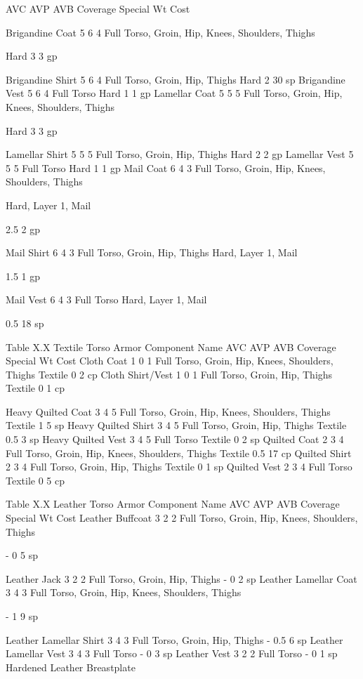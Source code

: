\documentclass[oneside,11pt,english]{book}
\begin{document}
AVC AVP AVB Coverage Special Wt Cost 

Brigandine Coat 5 6 4 Full Torso, Groin, Hip, Knees, Shoulders, 
Thighs 

Hard 3 3 gp 

Brigandine Shirt 5 6 4 Full Torso, Groin, Hip, Thighs Hard 2 30 
sp 
Brigandine Vest 5 6 4 Full Torso Hard 1 1 gp 
Lamellar Coat 5 5 5 Full Torso, Groin, Hip, Knees, Shoulders, 
Thighs 

Hard 3 3 gp 

Lamellar Shirt 5 5 5 Full Torso, Groin, Hip, Thighs Hard 2 2 gp 
Lamellar Vest 5 5 5 Full Torso Hard 1 1 gp 
Mail Coat 6 4 3 Full Torso, Groin, Hip, Knees, Shoulders, 
Thighs 

Hard, Layer 1, 
Mail 

2.5 2 gp 

Mail Shirt 6 4 3 Full Torso, Groin, Hip, Thighs Hard, Layer 1, 
Mail 

1.5 1 gp 

Mail Vest 6 4 3 Full Torso Hard, Layer 1, 
Mail 

0.5 18 
sp 

 
Table X.X Textile Torso Armor 
Component Name AVC AVP AVB Coverage Special Wt Cost 
Cloth Coat 1 0 1 Full Torso, Groin, Hip, Knees, Shoulders, Thighs Textile 0 2 cp 
Cloth Shirt/Vest 1 0 1 Full Torso, Groin, Hip, Thighs Textile 0 1 cp 


Heavy Quilted Coat 3 4 5 Full Torso, Groin, Hip, Knees, Shoulders, Thighs Textile 1 5 sp 
Heavy Quilted Shirt 3 4 5 Full Torso, Groin, Hip, Thighs Textile 0.5 3 sp 
Heavy Quilted Vest 3 4 5 Full Torso Textile 0 2 sp 
Quilted Coat 2 3 4 Full Torso, Groin, Hip, Knees, Shoulders, Thighs Textile 0.5 17 cp 
Quilted Shirt 2 3 4 Full Torso, Groin, Hip, Thighs Textile 0 1 sp 
Quilted Vest 2 3 4 Full Torso Textile 0 5 cp 

 
Table X.X Leather Torso Armor 
Component Name AVC AVP AVB Coverage Special Wt Cost 
Leather Buffcoat 3 2 2 Full Torso, Groin, Hip, Knees, Shoulders, 
Thighs 

- 0 5 sp 

Leather Jack 3 2 2 Full Torso, Groin, Hip, Thighs - 0 2 sp 
Leather Lamellar Coat 3 4 3 Full Torso, Groin, Hip, Knees, Shoulders, 
Thighs 

- 1 9 sp 

Leather Lamellar Shirt 3 4 3 Full Torso, Groin, Hip, Thighs - 0.5 6 sp 
Leather Lamellar Vest 3 4 3 Full Torso - 0 3 sp 
Leather Vest 3 2 2 Full Torso - 0 1 sp 
Hardened Leather 
Breastplate 
\end{document}
